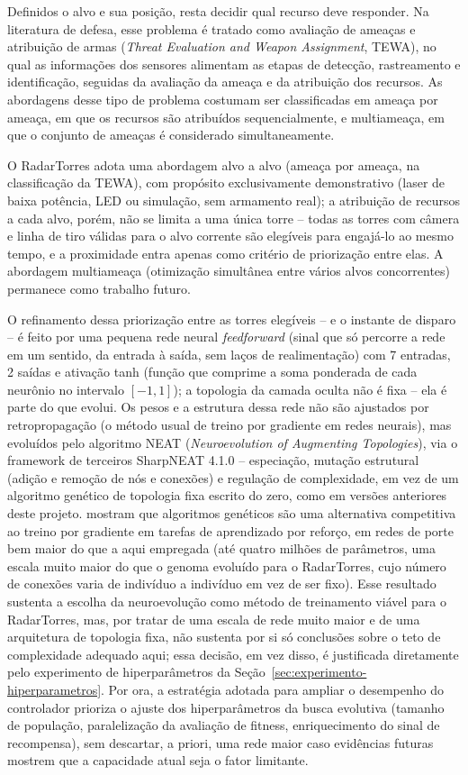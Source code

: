 \documentclass[12pt,a4paper]{article}
\begin{document}
Definidos o alvo e sua posição, resta decidir qual recurso deve responder. Na literatura de defesa,
esse problema é tratado como avaliação de ameaças e atribuição de armas (\textit{Threat Evaluation
and Weapon Assignment}, TEWA), no qual as informações dos sensores alimentam as etapas de detecção,
rastreamento e identificação, seguidas da avaliação da ameaça e da atribuição dos recursos. As
abordagens desse tipo de problema costumam ser classificadas em ameaça por ameaça, em que os
recursos são atribuídos sequencialmente, e multiameaça, em que o conjunto de ameaças é considerado
simultaneamente.

O RadarTorres adota uma abordagem alvo a alvo (ameaça por ameaça, na classificação da TEWA), com
propósito exclusivamente demonstrativo (laser de baixa potência, LED ou simulação, sem armamento
real); a atribuição de recursos a cada alvo, porém, não se limita a uma única torre -- todas as
torres com câmera e linha de tiro válidas para o alvo corrente são elegíveis para engajá-lo ao
mesmo tempo, e a proximidade entra apenas como critério de priorização entre elas. A abordagem
multiameaça (otimização simultânea entre vários alvos concorrentes) permanece como trabalho
futuro.

O refinamento dessa priorização entre as torres elegíveis -- e o instante de disparo -- é feito por uma pequena
rede neural \textit{feedforward} (sinal que só percorre a rede em um sentido, da entrada à saída,
sem laços de realimentação) com 7 entradas, 2 saídas e ativação tanh (função que comprime a soma
ponderada de cada neurônio no intervalo $[-1,1]$); a topologia da camada oculta não é fixa -- ela
é parte do que evolui. Os pesos e a estrutura dessa rede não são ajustados por retropropagação (o
método usual de treino por gradiente em redes neurais), mas evoluídos pelo algoritmo NEAT
(\textit{Neuroevolution of Augmenting Topologies}), via o framework de terceiros SharpNEAT 4.1.0 --
especiação, mutação estrutural (adição e remoção de nós e conexões) e regulação de complexidade,
em vez de um algoritmo genético de topologia fixa escrito do zero, como em versões anteriores
deste projeto.  mostram que algoritmos genéticos são uma
alternativa competitiva ao treino por gradiente em tarefas de aprendizado por reforço, em redes de
porte bem maior do que a aqui empregada (até quatro milhões de parâmetros, uma escala muito maior
do que o genoma evoluído para o RadarTorres, cujo número de conexões varia de indivíduo a
indivíduo em vez de ser fixo). Esse resultado sustenta a escolha da neuroevolução como método de
treinamento viável para o RadarTorres, mas, por tratar de uma escala de rede muito maior e de uma
arquitetura de topologia fixa, não sustenta por si só conclusões sobre o teto de complexidade
adequado aqui; essa decisão, em vez disso, é justificada diretamente pelo experimento de
hiperparâmetros da Seção~\ref{sec:experimento-hiperparametros}. Por ora, a estratégia adotada para
ampliar o desempenho do controlador prioriza o ajuste dos hiperparâmetros da busca evolutiva
(tamanho de população, paralelização da avaliação de fitness, enriquecimento do sinal de
recompensa), sem descartar, a priori, uma rede maior caso evidências futuras mostrem que a
capacidade atual seja o fator limitante.
\end{document}

